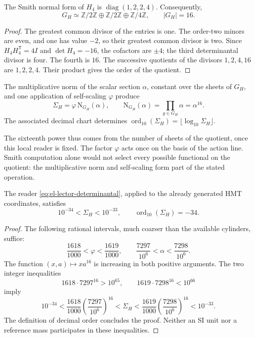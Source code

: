 \begin{lemma}
The Smith normal form of \(H_4\) is
\(\operatorname{diag}(1,2,2,4)\). Consequently,
\[
 G_H\simeq\mathbb Z/2\mathbb Z\oplus\mathbb Z/2\mathbb Z
 \oplus\mathbb Z/4\mathbb Z,\qquad |G_H|=16.
\]
\end{lemma}
\begin{proof}
The greatest common divisor of the entries is one. The order-two minors
are even, and one has value \(-2\), so their greatest common divisor
is two. Since \(H_4H_4^{\mathsf T}=4I\) and \(\det H_4=-16\), the
cofactors are \(\pm4\); the third determinantal divisor is four.
The fourth is \(16\). The successive quotients of the divisors
\(1,2,4,16\) are \(1,2,2,4\). Their product gives the order of the quotient.
\end{proof}

\begin{definition}
The multiplicative norm of the scalar section \(\alpha\), constant
over the sheets of \(G_H\), and one application of self-scaling
\(\varphi\) produce
\begin{equation}
 \Sigma_H=\varphi\,\mathrm N_{G_H}(\alpha),\qquad
 \mathrm N_{G_H}(\alpha)=\prod_{g\in G_H}\alpha=\alpha^{16}.
 \label{eq:el-lector-determinantal}
\end{equation}
The associated decimal chart determines
\(\operatorname{ord}_{10}(\Sigma_H)=\lfloor\log_{10}\Sigma_H\rfloor\).
\end{definition}

The sixteenth power thus comes from the number of sheets of the quotient,
once this local reader is fixed. The factor \(\varphi\) acts once on
the basis of the action line. Smith computation alone would not
select every possible functional on the quotient: the multiplicative
norm and self-scaling form part of the stated operation.

\begin{theorem}
The reader \eqref{eq:el-lector-determinantal}, applied to the already
generated HMT coordinates, satisfies
\begin{equation}
 10^{-34}<\Sigma_H<10^{-33},\qquad
 \operatorname{ord}_{10}(\Sigma_H)=-34.
 \label{eq:el-decada}
\end{equation}
\end{theorem}
\begin{proof}
The following rational intervals, much coarser than the available
cylinders, suffice:
\[
 \frac{1618}{1000}<\varphi<\frac{1619}{1000},\qquad
 \frac{7297}{10^6}<\alpha<\frac{7298}{10^6}.
\]
The function \((x,a)\mapsto xa^{16}\) is increasing in both positive
arguments. The two integer inequalities
\[
 1618\cdot7297^{16}>10^{65},\qquad
 1619\cdot7298^{16}<10^{66}
\]
imply
\[
 10^{-34}
 <\frac{1618}{1000}\left(\frac{7297}{10^6}\right)^{16}
 <\Sigma_H
 <\frac{1619}{1000}\left(\frac{7298}{10^6}\right)^{16}
 <10^{-33}.
\]
The definition of decimal order concludes the proof. Neither an
SI unit nor a reference mass participates in these inequalities.
\end{proof}

